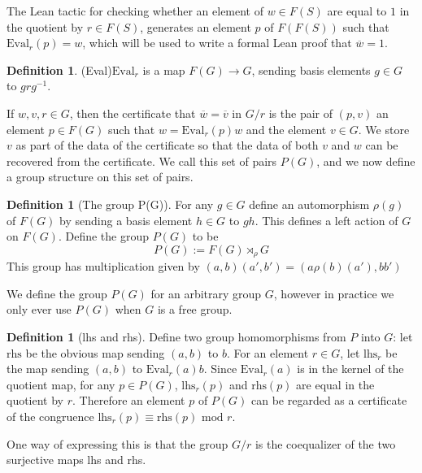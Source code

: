 \documentclass[12pt]{article} %
\theoremstyle{definition}
\theoremstyle{definition}
\theoremstyle{definition}
\theoremstyle{definition}
\newtheorem{defn}[thm]{Definition}
\begin{document}
The Lean tactic
for checking whether an element of $w \in F(S)$ are equal to $1$ in the quotient by $r \in F(S)$,
generates an element $p$ of $F(F(S))$ such that $\text{Eval}_r(p) = w$, which will be used to write
a formal Lean proof that $\overline{w} = 1$.

\begin{defn}(Eval)\label{Eval}
  $\text{Eval}_r$ is a map $F(G) \to G$, sending basis elements $g \in G$ to $grg^{-1}$.
\end{defn}

If $w, v, r \in G$, then the certificate that
$\overline{w} = \overline{v}$ in $G / r$ is the pair of $(p, v)$ an element
$p \in F(G)$ such that $w = \text{Eval}_r(p) w$ and the element $v \in G$.
We store $v$ as part of the data of the certificate so that the
data of both $v$ and $w$ can be recovered from the certificate.
We call this set of pairs $P(G)$, and we now define
a group structure on this set of pairs.

\begin{defn}[The group P(G)]
  For any $g \in G$ define an automorphism $\rho(g)$ of $F(G)$ by sending a basis
  element $h \in G$ to $gh$. This defines a left action of $G$ on $F(G)$.
  Define the group $P(G)$ to be
  \begin{equation}
  P(G) := F(G) \rtimes_{\rho} G
  \end{equation}
  This group has multiplication given by $(a, b) (a', b') = (a \rho(b)(a'), bb')$
\end{defn}

We define the group $P(G)$ for an arbitrary group $G$, however in practice we only
ever use $P(G)$ when $G$ is a free group.

\begin{defn}[lhs and rhs]
Define two group homomorphisms from $P$ into $G$: let
$\text{rhs}$ be the obvious map sending $(a, b)$ to $b$.
For an element $r \in G$, let $\text{lhs}_r$ be the map sending
$(a,b)$ to $\text{Eval}_r(a)b$.
Since $\text{Eval}_r(a)$ is in the kernel of the quotient map,
for any $p\in P(G)$, $\text{lhs}_r(p)$ and $\text{rhs}(p)$ are equal in the quotient by $r$.
Therefore an element $p$ of $P(G)$ can be regarded as a certificate of the congruence
$\text{lhs}_r(p) \equiv \text{rhs}(p) \text{ mod } r$.
\end{defn}

One way of expressing this is that the group $G / r$ is the coequalizer of
the two surjective maps lhs and rhs.

\end{document}
